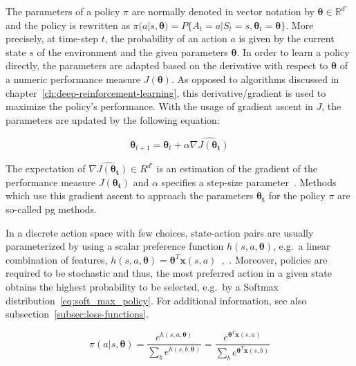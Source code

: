 \documentclass[draft,final]{vutinfth} %
\newcommand{\p}[1]{see p. #1}
\begin{document}
    The parameters of a policy $\pi$ are normally denoted in vector notation by $\boldsymbol{\theta} \in \mathbb{R}^{d'}$ and the policy is rewritten as $\pi(a|s,\boldsymbol{\theta})=P\{A_t=a|S_t=s,\boldsymbol{\theta}_t=\boldsymbol{\theta}\}$.
    More precisely, at time-step $t$, the probability of an action $a$ is given by the current state $s$ of the environment and the given parameters $\boldsymbol{\theta}$.
    In order to learn a policy directly, the parameters are adapted based on the derivative with respect to $\boldsymbol{\theta}$ of a numeric performance measure $J(\boldsymbol{\theta})$.
    As opposed to algorithms discussed in chapter~\ref{ch:deep-reinforcement-learning}, this derivative/gradient is used to maximize the policy's performance.
    With the usage of gradient ascent in $J$, the parameters are updated by the following equation:

    \begin{equation}
        \boldsymbol{\theta}_{t+1}=\boldsymbol{\theta}_{t} + \alpha \widehat{\nabla J(\boldsymbol{\theta_t})}\label{eq:parameter_update}
    \end{equation}

    The expectation of $\widehat{\nabla J(\boldsymbol{\theta_t})} \in R^{d'}$ is an estimation of the gradient of the performance measure $J(\boldsymbol{\theta_t})$ and $\alpha$ specifies a step-size parameter~.
    Methods which use this gradient ascent to approach the parameters $\boldsymbol{\theta_t}$ for the policy $\pi$ are so-called \gls{pg} methods.

    In a discrete action space with few choices, state-action pairs are usually parameterized by using a scalar preference function $h(s,a,\boldsymbol{\theta})$, e.g.\ a linear combination of features, $h(s,a,\boldsymbol{\theta})=\boldsymbol{\theta}^T\boldsymbol{x}(s,a)$~\citep[\p{321}]{sutton_reinforcement_2018},~.
    Moreover, policies are required to be stochastic and thus, the most preferred action in a given state obtains the highest probability to be selected, e.g.\ by a Softmax distribution~\eqref{eq:soft_max_policy}.
    For additional information, see also subsection~\ref{subsec:loss-functions}.

    \begin{equation}
        \pi(a|s,\boldsymbol{\theta})=\frac{e^{h(s,a,\boldsymbol{\theta})}}{\sum_{b}e^{h(s,b,\boldsymbol{\theta})}}=\frac{e^{\boldsymbol{\theta}^T\boldsymbol{x}(s,a)}}{\sum_{b}e^{\boldsymbol{\theta}^T\boldsymbol{x}(s,b)}}\label{eq:soft_max_policy}
    \end{equation}
\end{document}
